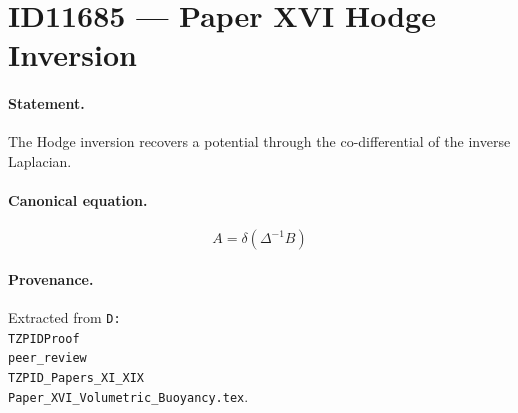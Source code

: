 \section*{ID11685 --- Paper XVI Hodge Inversion}

\paragraph{Statement.}
The Hodge inversion recovers a potential through the co-differential of the inverse Laplacian.

\paragraph{Canonical equation.}
\[
A=\delta(\Delta^{-1}B)
\]

\paragraph{Provenance.}
Extracted from \texttt{D:\\TZPIDProof\\peer\_review\\TZPID\_Papers\_XI\_XIX\\Paper\_XVI\_Volumetric\_Buoyancy.tex}.
